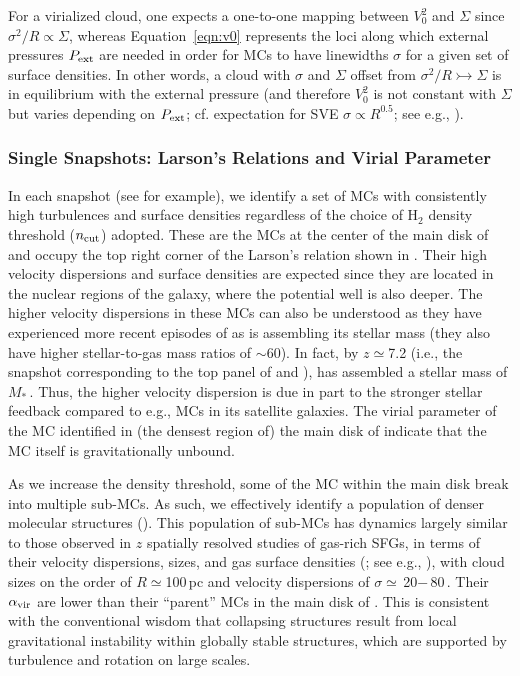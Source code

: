 \documentclass[apj]{emulateapj} %
\begin{document}
For a virialized cloud, one expects a one-to-one mapping between $V_0^2$ and $\Sigma$ since
$\sigma^2/R\propto\Sigma$, whereas 
Equation~\ref{eqn:v0} represents the loci along which external pressures $P_{\rm ext}$ are 
needed in order for MCs to have linewidths $\sigma$ for a given set of surface densities. 
In other words, a cloud with $\sigma$ and $\Sigma$ offset from $\sigma^2/R\rightarrowtail\Sigma$ 
is in equilibrium with the external pressure (and therefore $V_0^2$ is not constant with $\Sigma$ but
varies depending on $P_{\rm ext}$; cf. expectation for SVE
$\sigma\propto R^{0.5}$; see e.g., \citealt{Heyer09a, Hughes10a, Hughes13b, Meidt13a}).


\subsubsection{Single Snapshots: Larson's Relations and Virial Parameter}  \label{sec:singless}

In each snapshot (see  for example), 
we identify a set of MCs with consistently high turbulences and surface densities 
regardless of the choice of H$_2$ density threshold ($n_{\rm cut}$) adopted.
These are the MCs at the center of the main disk of \flower and 
occupy the top right corner of the Larson's relation shown in .
Their high velocity dispersions and surface densities are expected since 
they are located in the nuclear regions of the 
galaxy, where the potential well is also deeper. The higher velocity dispersions 
in these MCs can also be understood as they have experienced more recent episodes 
of \SF as \flower is assembling its stellar mass (they also have higher stellar-to-gas mass ratios of $\sim$60). 
In fact, by $z\simeq$7.2 (i.e., the snapshot corresponding
to the top panel of  and ), \flower has assembled 
a stellar mass of $M_*$\,\Msun. Thus, the higher velocity dispersion 
is due in part to the stronger stellar feedback compared to e.g., MCs in its satellite galaxies.
The virial parameter of the MC identified in (the densest region of) the main disk of \flower 
indicate that the MC itself is gravitationally unbound.

As we increase the density threshold, some of the MC within the main disk break 
into multiple sub-MCs.
As such, we effectively identify a population of denser molecular structures (). 
This population of sub-MCs has dynamics largely
similar to those observed 
in $z$ spatially resolved studies of gas-rich SFGs, in
terms of their velocity dispersions, sizes, and gas surface densities (; see 
e.g., \citealt{Swinbank11a}),
with cloud sizes on the order of $R\simeq$100\,pc and velocity 
dispersions of $\sigma\simeq$\,20$-$\,80\,\kms. Their $\alpha_{\rm vir}$ 
are lower than their ``parent'' MCs in the main disk of \flower. This is consistent with
the conventional wisdom that collapsing structures result from local gravitational 
instability within globally stable structures, which are supported by 
turbulence and rotation on large scales.
\end{document}
